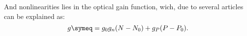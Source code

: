 And nonlinearities lies in the optical gain function, wich, due to several articles can be explained as:
\begin{equation}
	g \symeq = g_0 g_n(N-N_0) + g_P(P- P_0).
\end{equation}